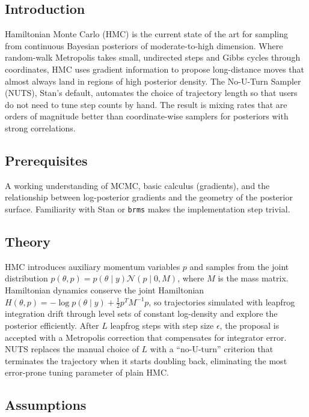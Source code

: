 \documentclass[
]{article}
\author{}
\date{\vspace{-2.5em}}
\begin{document}
\subsection{Introduction}\label{introduction}

Hamiltonian Monte Carlo (HMC) is the current state of the art for
sampling from continuous Bayesian posteriors of moderate-to-high
dimension. Where random-walk Metropolis takes small, undirected steps
and Gibbs cycles through coordinates, HMC uses gradient information to
propose long-distance moves that almost always land in regions of high
posterior density. The No-U-Turn Sampler (NUTS), Stan's default,
automates the choice of trajectory length so that users do not need to
tune step counts by hand. The result is mixing rates that are orders of
magnitude better than coordinate-wise samplers for posteriors with
strong correlations.

\subsection{Prerequisites}\label{prerequisites}

A working understanding of MCMC, basic calculus (gradients), and the
relationship between log-posterior gradients and the geometry of the
posterior surface. Familiarity with Stan or \texttt{brms} makes the
implementation step trivial.

\subsection{Theory}\label{theory}

HMC introduces auxiliary momentum variables \(p\) and samples from the
joint distribution
\(p(\theta, p) = p(\theta \mid y) \mathcal N(p \mid 0, M)\), where \(M\)
is the mass matrix. Hamiltonian dynamics conserve the joint Hamiltonian
\(H(\theta, p) = -\log p(\theta \mid y) + \tfrac{1}{2} p^T M^{-1} p\),
so trajectories simulated with leapfrog integration drift through level
sets of constant log-density and explore the posterior efficiently.
After \(L\) leapfrog steps with step size \(\epsilon\), the proposal is
accepted with a Metropolis correction that compensates for integrator
error. NUTS replaces the manual choice of \(L\) with a ``no-U-turn''
criterion that terminates the trajectory when it starts doubling back,
eliminating the most error-prone tuning parameter of plain HMC.

\subsection{Assumptions}\label{assumptions}
\end{document}
